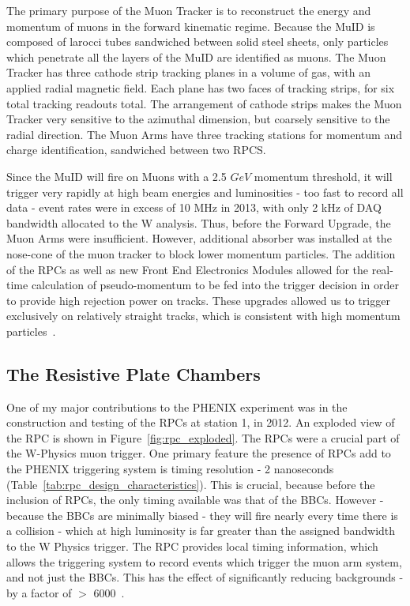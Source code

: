 The primary purpose of the Muon Tracker is to reconstruct the energy and
momentum of muons in the forward kinematic regime. Because the MuID is composed
of larocci tubes sandwiched between solid steel sheets, only particles which
penetrate all the layers of the MuID are identified as muons. The Muon Tracker
has three cathode strip tracking planes in a volume of gas, with an applied
radial magnetic field. Each plane has two faces of tracking strips, for six
total tracking readouts total. The arrangement of cathode strips  makes the Muon
Tracker very sensitive to the azimuthal dimension, but coarsely sensitive to the
radial direction. The Muon Arms have three tracking stations for momentum and
charge identification, sandwiched between two RPCS.

Since the MuID will fire on Muons with a 2.5 $GeV$ momentum threshold, it will
trigger very rapidly at high beam energies and luminosities - too fast to record
all data - event rates were in excess of 10 MHz in 2013, with only 2 kHz of DAQ
bandwidth allocated to the W analysis. Thus, before the Forward Upgrade, the
Muon Arms were insufficient. However, additional absorber was installed at the
nose-cone of the muon tracker to block lower momentum particles. The addition of
the RPCs as well as new Front End Electronics Modules allowed for the real-time
calculation of pseudo-momentum to be fed into the trigger decision in order to
provide high rejection power on tracks. These upgrades allowed us to trigger
exclusively on relatively straight tracks, which is consistent with high
momentum particles~\cite{Fukao2011}.

\clearpage
\subsection{The Resistive Plate Chambers}

One of my major contributions to the PHENIX experiment was in the construction
and testing of the RPCs at station 1, in 2012. An exploded view of the RPC is
shown in Figure~\ref{fig:rpc_exploded}. The RPCs were a crucial part of the
W-Physics muon trigger. One primary feature the presence of RPCs add to the
PHENIX triggering system is timing resolution - 2 nanoseconds
(Table~\ref{tab:rpc_design_characteristics}). This is crucial, because before
the inclusion of RPCs, the only timing available was that of the BBCs. However -
because the BBCs are minimally biased - they will fire nearly every time there
is a collision - which at high luminosity is far greater than the assigned
bandwidth to the W Physics trigger. The RPC provides local timing information,
which allows the triggering system to record events which trigger the muon arm
system, and not just the BBCs. This has the effect of significantly reducing
backgrounds - by a factor of $>$ 6000~\cite{Fukao2011}. 

